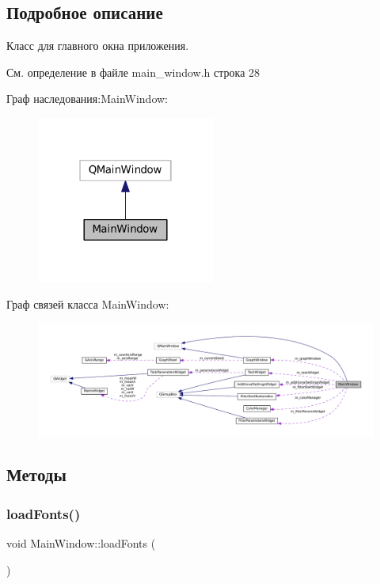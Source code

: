 \subsection{Подробное описание}
Класс для главного окна приложения. 

См. определение в файле main\+\_\+window.\+h строка 28



Граф наследования\+:Main\+Window\+:
\nopagebreak
\begin{figure}[H]
\begin{center}
\leavevmode
\includegraphics[width=166pt]{class_main_window__inherit__graph}
\end{center}
\end{figure}


Граф связей класса Main\+Window\+:
\nopagebreak
\begin{figure}[H]
\begin{center}
\leavevmode
\includegraphics[width=350pt]{class_main_window__coll__graph}
\end{center}
\end{figure}


\subsection{Методы}
\hypertarget{class_main_window_af0898886d5a3e9c0b336312e959daae6}{}\label{class_main_window_af0898886d5a3e9c0b336312e959daae6} 
\subsubsection{\texorpdfstring{load\+Fonts()}{loadFonts()}}
{\footnotesize\ttfamily void Main\+Window\+::load\+Fonts (\begin{DoxyParamCaption}{ }\end{DoxyParamCaption})\hspace{0.3cm}{\ttfamily [private]}}



